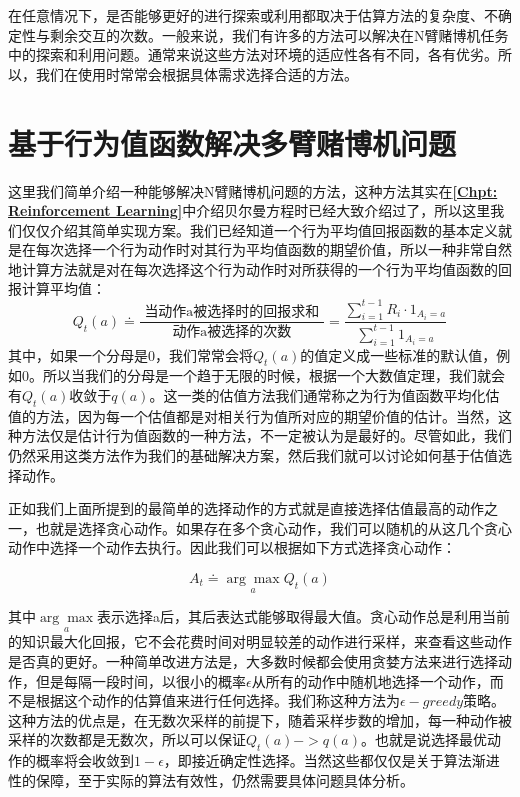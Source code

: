 在任意情况下，是否能够更好的进行探索或利用都取决于估算方法的复杂度、不确定性与剩余交互的次数。一般来说，我们有许多的方法可以解决在N臂赌博机任务中的探索和利用问题。通常来说这些方法对环境的适应性各有不同，各有优劣。所以，我们在使用时常常会根据具体需求选择合适的方法。

\section{基于行为值函数解决多臂赌博机问题}
这里我们简单介绍一种能够解决N臂赌博机问题的方法，这种方法其实在\textbf{\ref{Chpt: Reinforcement Learning}}中介绍贝尔曼方程时已经大致介绍过了，所以这里我们仅仅介绍其简单实现方案。我们已经知道一个行为平均值回报函数的基本定义就是在每次选择一个行为动作时对其行为平均值函数的期望价值，所以一种非常自然地计算方法就是对在每次选择这个行为动作时对所获得的一个行为平均值函数的回报计算平均值：
\begin{equation}
    Q_{t}(a) \doteq \frac{\text { 当动作a被选择时的回报求和 }}{\text {动作a被选择的次数} }=\frac{\sum_{i=1}^{t-1} R_{i} \cdot \mathcal{1}_{A_{i}=a}}{\sum_{i=1}^{t-1} \mathcal{1}_{A_{i}=a}}
\end{equation}
其中，如果一个分母是0，我们常常会将$Q_t(a)$的值定义成一些标准的默认值，例如0。所以当我们的分母是一个趋于无限的时候，根据一个大数值定理，我们就会有$Q_t(a)$收敛于$q(a)$。这一类的估值方法我们通常称之为行为值函数平均化估值的方法，因为每一个估值都是对相关行为值所对应的期望价值的估计。当然，这种方法仅是估计行为值函数的一种方法，不一定被认为是最好的。尽管如此，我们仍然采用这类方法作为我们的基础解决方案，然后我们就可以讨论如何基于估值选择动作。

正如我们上面所提到的最简单的选择动作的方式就是直接选择估值最高的动作之一，也就是选择贪心动作。如果存在多个贪心动作，我们可以随机的从这几个贪心动作中选择一个动作去执行。因此我们可以根据如下方式选择贪心动作：

\begin{equation}
    A_{t} \doteq \underset{a}{\arg \max } Q_{t}(a)
\end{equation}

其中$ \underset{a}{\arg \max } $表示选择a后，其后表达式能够取得最大值。贪心动作总是利用当前的知识最大化回报，它不会花费时间对明显较差的动作进行采样，来查看这些动作是否真的更好。一种简单改进方法是，大多数时候都会使用贪婪方法来进行选择动作，但是每隔一段时间，以很小的概率$\epsilon$从所有的动作中随机地选择一个动作，而不是根据这个动作的估算值来进行任何选择。我们称这种方法为$\epsilon-greedy$策略。这种方法的优点是，在无数次采样的前提下，随着采样步数的增加，每一种动作被采样的次数都是无数次，所以可以保证$Q_t(a)->q(a)$。也就是说选择最优动作的概率将会收敛到$1-\epsilon$，即接近确定性选择。当然这些都仅仅是关于算法渐进性的保障，至于实际的算法有效性，仍然需要具体问题具体分析。


